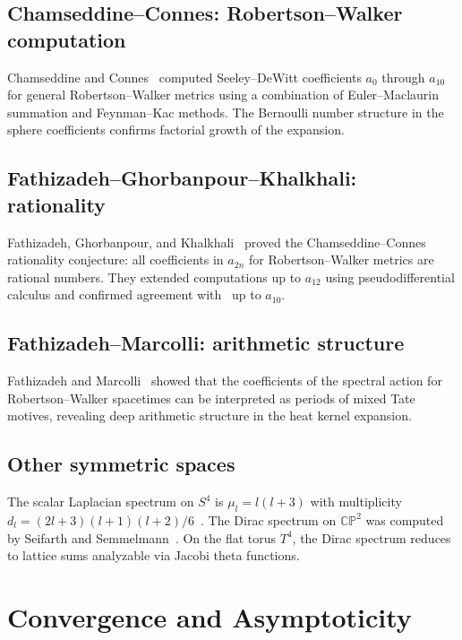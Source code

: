 \documentclass[11pt,a4paper]{article}
\begin{document}
\subsection{Chamseddine--Connes: Robertson--Walker computation}

Chamseddine and Connes~\cite{CC11} computed Seeley--DeWitt coefficients
$a_0$ through $a_{10}$ for general Robertson--Walker metrics using a
combination of Euler--Maclaurin summation and Feynman--Kac methods.
The Bernoulli number structure in the sphere coefficients confirms
factorial growth of the expansion.

\subsection{Fathizadeh--Ghorbanpour--Khalkhali: rationality}

Fathizadeh, Ghorbanpour, and Khalkhali~\cite{FGK14} proved the
Chamseddine--Connes rationality conjecture: all coefficients in
$a_{2n}$ for Robertson--Walker metrics are rational numbers.  They
extended computations up to $a_{12}$ using pseudodifferential calculus
and confirmed agreement with~\cite{CC11} up to $a_{10}$.

\subsection{Fathizadeh--Marcolli: arithmetic structure}

Fathizadeh and Marcolli~\cite{FM16} showed that the coefficients of
the spectral action for Robertson--Walker spacetimes can be interpreted
as periods of mixed Tate motives, revealing deep arithmetic structure
in the heat kernel expansion.

\subsection{Other symmetric spaces}

The scalar Laplacian spectrum on $S^4$ is $\mu_l = l(l+3)$ with
multiplicity $d_l = (2l+3)(l+1)(l+2)/6$~\cite{BGM71}.  The Dirac
spectrum on $\mathbb{CP}^2$ was computed by Seifarth and
Semmelmann~\cite{SS93}.  On the flat torus $T^4$, the Dirac spectrum
reduces to lattice sums analyzable via Jacobi theta functions.


\section{Convergence and Asymptoticity}\label{sec:convergence}
\end{document}
